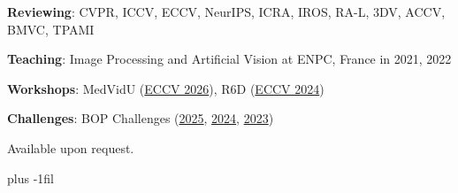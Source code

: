 \documentclass[letterpaper,10pt]{article}
\newlength{\labelcol}
\newcommand{\sublabelfont}{\fontsize{9}{11}\selectfont\itshape}
\newcommand{\labelfont}{\fontsize{9}{11}\selectfont\addfontfeature{LetterSpace=6}}
\newenvironment{cvsection}[2][]{%
  \begin{list}{}{%
    \setlength{\leftmargin}{\labelcol}%
    \setlength{\labelwidth}{\labelcol}%
    \setlength{\labelsep}{0pt}%
    \setlength{\itemsep}{0pt}%
    \setlength{\topsep}{0pt}%
    \setlength{\parsep}{0pt}%
  }%
  \item[{\raisebox{0pt}[0pt][0pt]{\parbox[t]{\labelcol}{\raggedright{\labelfont\MakeUppercase{#2}}\ifx\relax#1\relax\else\\[1pt]{\sublabelfont #1}\fi}}}]%
}{%
  \end{list}%
  \vspace{12pt plus 8pt}%
}
\begin{document}
\begin{cvsection}{Services}
\textbf{Reviewing}: CVPR, ICCV, ECCV, NeurIPS, ICRA, IROS, RA-L, 3DV, ACCV, BMVC, TPAMI\par\vspace{4pt}
\textbf{Teaching}: Image Processing and Artificial Vision at ENPC, France in 2021, 2022\par\vspace{4pt}
\textbf{Workshops}: MedVidU (\href{https://medvidu.github.io/}{ECCV 2026}), R6D (\href{https://cmp.felk.cvut.cz/sixd/workshop_2024/}{ECCV 2024})\par\vspace{4pt}
\textbf{Challenges}: BOP Challenges (\href{https://bop.felk.cvut.cz/challenges/bop-challenge-2025/}{2025}, \href{https://bop.felk.cvut.cz/challenges/bop-challenge-2024/}{2024}, \href{https://bop.felk.cvut.cz/challenges/bop-challenge-2023/}{2023})
\end{cvsection}

\begin{cvsection}{References}
Available upon request.
\end{cvsection}

\vskip 0pt plus -1fil
\end{document}
